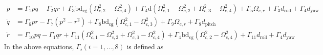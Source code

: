 \documentclass[3p]{elsarticle}
\begin{document}
\begin{align}
    \dot{p} &= \Gamma_1 pq - \Gamma_2 qr + \Gamma_3 \mathrm{b}\mathrm{d}_{\text{cg}} (\Omega_{c, 2}^2 - \Omega_{c, 4}^2) + \Gamma_4 \mathrm{d} (\Omega_{c, 1}^2 - \Omega_{c, 2}^2 + \Omega_{c, 3}^2 - \Omega_{c, 4}^2) + \Gamma_5 \Omega_{c, r} + \Gamma_3 d_{\text{roll}} + \Gamma_4 d_{\text{yaw}} \\
    \dot{q} &= \Gamma_6 pr - \Gamma_7 (p^2 - r^2) + \Gamma_8  \mathrm{b}\mathrm{d}_{\text{cg}}(\Omega_{c, 1}^2 - \Omega_{c, 3}^2) + \Gamma_9 \Omega_{c, r} + \Gamma_8 d_{\text{pitch}} \\
    \dot{r} &= \Gamma_{10} pq - \Gamma_{1} qr + \Gamma_{11} (\Omega_{c, 1}^2 - \Omega_{c, 2}^2 + \Omega_{c, 3}^2 - \Omega_{c, 4}^2) + \Gamma_{4}  \mathrm{b}\mathrm{d}_{\text{cg}} (\Omega_{c, 2}^2 - \Omega_{c, 4}^2) + \Gamma_{11} d_{\text{roll}} + \Gamma_{4} d_{\text{yaw}}
\end{align}
In the above equations, $\Gamma_i (i = 1, \ldots, 8)$ is defined as
\end{document}
